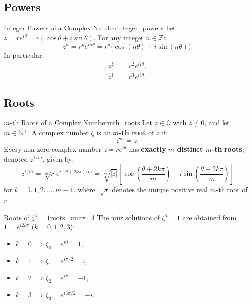 \subsection{Powers}

\begin{proposition}{Integer Powers of a Complex Number}{integer_powers}
Let $z = r e^{i\theta} = r(\cos\theta + i\sin\theta)$. For any integer $n \in \mathbb{Z}$:
\begin{equation}
z^n = r^n e^{i n\theta} = r^n \big(\cos(n\theta) + i \sin(n\theta)\big).
\end{equation}
In particular:
\begin{align}
z^2 &= r^2 e^{i 2\theta}, \\
z^3 &= r^3 e^{i 3\theta}.
\end{align}
\end{proposition}

\subsection{Roots}

\begin{definition}{$m$-th Roots of a Complex Number}{mth_roots}
Let $z \in \mathbb{C}$ with $z \neq 0$, and let $m \in \mathbb{N}^+$. A complex number $\zeta$ is an \textbf{$m$-th root} of $z$ if:
\begin{equation}
\zeta^m = z.
\end{equation}
Every non-zero complex number $z = r e^{i\theta}$ has \textbf{exactly $m$ distinct $m$-th roots}, denoted $z^{1/m}$, given by:
\begin{equation}
z^{1/m} = \sqrt[m]{r} \, e^{i(\theta + 2k\pi)/m} = \sqrt[m]{|z|} \left[\cos\left(\frac{\theta + 2k\pi}{m}\right) + i \sin\left(\frac{\theta + 2k\pi}{m}\right)\right]
\end{equation}
for $k = 0, 1, 2, \dots, m-1$, where $\sqrt[m]{r}$ denotes the unique positive real $m$-th root of $r$.
\end{definition}

\begin{example}{Roots of $\zeta^4 = 1$}{roots_unity_4}
The four solutions of $\zeta^4 = 1$ are obtained from $1 = e^{i 2k\pi}$ ($k=0,1,2,3$):
\begin{itemize}
    \item $k = 0 \implies \zeta_0 = e^{i 0} = 1$,
    \item $k = 1 \implies \zeta_1 = e^{i\pi/2} = i$,
    \item $k = 2 \implies \zeta_2 = e^{i\pi} = -1$,
    \item $k = 3 \implies \zeta_3 = e^{i 3\pi/2} = -i$.
\end{itemize}
\end{example}

